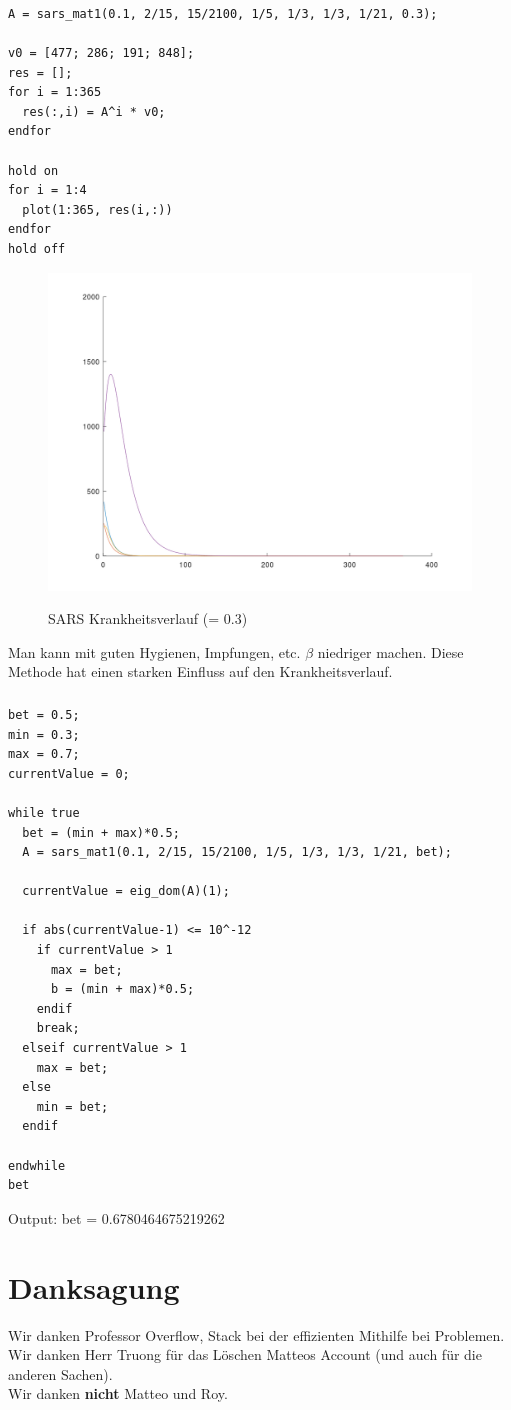 \documentclass{article}
\begin{document}
\subsubsection{}
\begin{lstlisting}
A = sars_mat1(0.1, 2/15, 15/2100, 1/5, 1/3, 1/3, 1/21, 0.3);

v0 = [477; 286; 191; 848];
res = [];
for i = 1:365
  res(:,i) = A^i * v0;
endfor

hold on
for i = 1:4
  plot(1:365, res(i,:))
endfor
hold off
\end{lstlisting}

\begin{figure}[H]
\centering
\includegraphics[scale=0.3]{SARS1h.png}
\label{fig:universe}
\caption{SARS Krankheitsverlauf (\beta = 0.3)}
\end{figure}

Man kann mit guten Hygienen, Impfungen, etc. $\beta$ niedriger machen.
Diese Methode hat einen starken Einfluss auf den Krankheitsverlauf.

\subsubsection{}
\begin{lstlisting}
bet = 0.5;
min = 0.3;
max = 0.7;
currentValue = 0;

while true
  bet = (min + max)*0.5;
  A = sars_mat1(0.1, 2/15, 15/2100, 1/5, 1/3, 1/3, 1/21, bet);
  
  currentValue = eig_dom(A)(1);
  
  if abs(currentValue-1) <= 10^-12
    if currentValue > 1
      max = bet;
      b = (min + max)*0.5;
    endif
    break;
  elseif currentValue > 1
    max = bet;
  else
    min = bet;
  endif
  
endwhile
bet
\end{lstlisting}
Output: bet = 0.6780464675219262

\vspace{5mm}

\section{Danksagung}
Wir danken Professor Overflow, Stack bei der effizienten Mithilfe bei Problemen. \\
Wir danken Herr Truong für das Löschen Matteos Account (und auch für die anderen Sachen). \\
Wir danken \textbf{nicht} Matteo und Roy. \\
\end{document}
